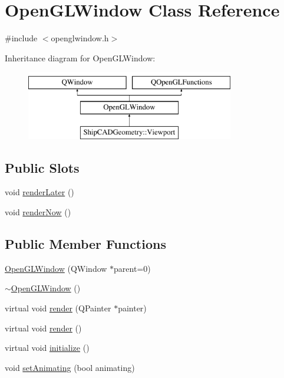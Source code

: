 \hypertarget{classOpenGLWindow}{\section{Open\-G\-L\-Window Class Reference}
\label{classOpenGLWindow}
}


{\ttfamily \#include $<$openglwindow.\-h$>$}

Inheritance diagram for Open\-G\-L\-Window\-:\begin{figure}[H]
\begin{center}
\leavevmode
\includegraphics[height=3.000000cm]{classOpenGLWindow}
\end{center}
\end{figure}
\subsection*{Public Slots}
\begin{DoxyCompactItemize}
\item 
void \hyperlink{classOpenGLWindow_abea9e50147496e5110b86f03122fbece}{render\-Later} ()
\item 
void \hyperlink{classOpenGLWindow_a8398ed62d646739fe54fae94c477ad1d}{render\-Now} ()
\end{DoxyCompactItemize}
\subsection*{Public Member Functions}
\begin{DoxyCompactItemize}
\item 
\hyperlink{classOpenGLWindow_a90bb7dbb2dcb27b1fdc56ef4ef3f25fc}{Open\-G\-L\-Window} (Q\-Window $\ast$parent=0)
\item 
\hyperlink{classOpenGLWindow_aa220b192c71871aab9100f4058a8d62d}{$\sim$\-Open\-G\-L\-Window} ()
\item 
virtual void \hyperlink{classOpenGLWindow_a186cffcb57053e4eda4875b1ab9aac92}{render} (Q\-Painter $\ast$painter)
\item 
virtual void \hyperlink{classOpenGLWindow_ac9e094864803a0b29364f42c2a47fa8c}{render} ()
\item 
virtual void \hyperlink{classOpenGLWindow_aed4e2ee22e113b2f7e7d1eba4ef1b965}{initialize} ()
\item 
void \hyperlink{classOpenGLWindow_a68317e3284d7b0ffba262eac059b6b9e}{set\-Animating} (bool animating)
\end{DoxyCompactItemize}
